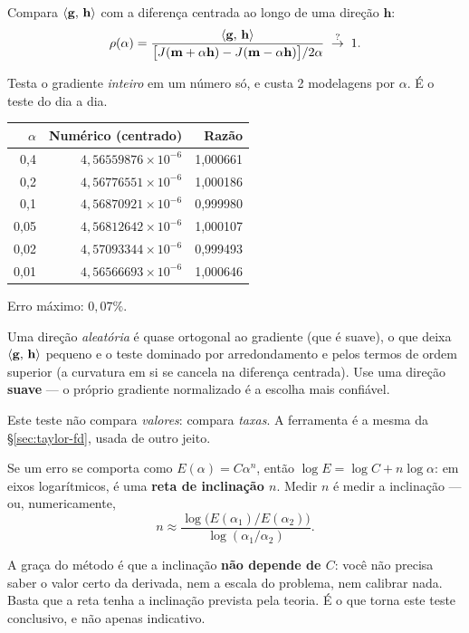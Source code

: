 \documentclass[11pt,a4paper,oneside]{report}
\begin{document}
Compara $\langle \mathbf{g},\,\mathbf{h}\rangle$ com a diferen\c{c}a centrada ao longo
de uma dire\c{c}\~ao $\mathbf{h}$:
\begin{equation}
\rho(\alpha) = \frac{\langle \mathbf{g},\,\mathbf{h}\rangle}
  {\bigl[J(\mathbf{m}+\alpha\mathbf{h}) - J(\mathbf{m}-\alpha\mathbf{h})\bigr]/2\alpha}
\;\stackrel{?}{\to}\; 1 .
\end{equation}

Testa o gradiente \emph{inteiro} em um n\'umero s\'o, e custa 2 modelagens por
$\alpha$. \'E o teste do dia a dia.

\begin{center}
\begin{tabular}{@{}rrr@{}}
\toprule
$\alpha$ & \textbf{Num\'erico (centrado)} & \textbf{Raz\~ao} \\
\midrule
0{,}4  & $4{,}56559876\times10^{-6}$ & 1{,}000661 \\
0{,}2  & $4{,}56776551\times10^{-6}$ & 1{,}000186 \\
0{,}1  & $4{,}56870921\times10^{-6}$ & 0{,}999980 \\
0{,}05 & $4{,}56812642\times10^{-6}$ & 1{,}000107 \\
0{,}02 & $4{,}57093344\times10^{-6}$ & 0{,}999493 \\
0{,}01 & $4{,}56566693\times10^{-6}$ & 1{,}000646 \\
\bottomrule
\end{tabular}
\end{center}
{\small Erro m\'aximo: $0{,}07\%$.}

\begin{atencao}
Uma dire\c{c}\~ao \emph{aleat\'oria} \'e quase ortogonal ao gradiente (que \'e
suave), o que deixa $\langle \mathbf{g},\,\mathbf{h}\rangle$ pequeno e o teste
dominado por arredondamento e pelos termos de ordem superior (a curvatura em
si se cancela na diferen\c{c}a centrada). Use uma dire\c{c}\~ao \textbf{suave} --- o pr\'oprio
gradiente normalizado \'e a escolha mais confi\'avel.
\end{atencao}

\begin{matematica}
Este teste n\~ao compara \emph{valores}: compara \emph{taxas}. A ferramenta
\'e a mesma da §\ref{sec:taylor-fd}, usada de outro jeito.

Se um erro se comporta como $E(\alpha) = C\alpha^{n}$, ent\~ao
$\log E = \log C + n\log\alpha$: em eixos logar\'itmicos, \'e uma
\textbf{reta de inclina\c{c}\~ao $n$}. Medir $n$ \'e medir a
inclina\c{c}\~ao --- ou, numericamente,
\[
n \approx \frac{\log\bigl(E(\alpha_1)/E(\alpha_2)\bigr)}
               {\log(\alpha_1/\alpha_2)} .
\]

A gra\c{c}a do m\'etodo \'e que a inclina\c{c}\~ao \textbf{n\~ao depende de
$C$}: voc\^e n\~ao precisa saber o valor certo da derivada, nem a escala do
problema, nem calibrar nada. Basta que a reta tenha a inclina\c{c}\~ao
prevista pela teoria. \'E o que torna este teste conclusivo, e n\~ao apenas
indicativo.
\end{matematica}
\end{document}
